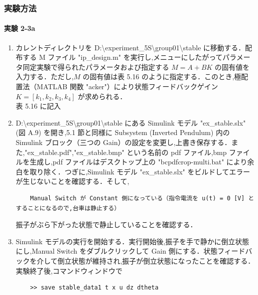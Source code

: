 \subsubsection{実験方法}

\paragraph{実験 2-3a}
\begin{enumerate}
  \item カレントディレクトリを D:\textbackslash experiment\_5S\textbackslash group01\textbackslash stable に移動する．配布する M ファイル "ip\_design.m" を実行し,メニューにしたがってパラメータ同定実験で得られたパラメータおよび指定する \( M = A + BK \) の固有値を入力する．ただし,\( M \) の固有値は表 5.16 のように指定する．このとき,極配置法（MATLAB 関数 "acker"）により状態フィードバックゲイン \( K = [k_1, k_2, k_3, k_4] \) が求められる．\\
        表 5.16 に記入
        
  \item D:\textbackslash experiment\_5S\textbackslash group01\textbackslash stable にある Simulink モデル "ex\_stable.slx" (図 A.9) を開き,5.1 節と同様に Subsystem (Inverted Pendulum) 内の Simulink ブロック（三つの Gain）の設定を変更し,上書き保存する．また,"ex\_stable.pdf","ex\_stable.bmp" という名前の pdf ファイル,bmp ファイルを生成し,pdf ファイルはデスクトップ上の "bcpdfcrop-multi.bat" により余白を取り除く．つぎに,Simulink モデル "ex\_stable.slx" をビルドしてエラーが生じないことを確認する．そして,
        
        \begin{tcolorbox}[colback=gray!5!white,colframe=gray!75!black]
          \begin{lstlisting}
    Manual Switch が Constant 側になっている（指令電流を u(t) = 0 [V] とすることになるので,台車は静止する）
    \end{lstlisting}
        \end{tcolorbox}
        
        振子がぶら下がった状態で静止していることを確認する．
        
  \item Simulink モデルの実行を開始する．実行開始後,振子を手で静かに倒立状態にし,Manual Switch をダブルクリックして Gain 側にする．状態フィードバックを介して倒立状態が維持され,振子が倒立状態になったことを確認する．実験終了後,コマンドウィンドウで
        
        \begin{tcolorbox}[colback=gray!5!white,colframe=gray!75!black]
          \begin{lstlisting}
    >> save stable_data1 t x u dz dtheta
    \end{lstlisting}
        \end{tcolorbox}
        

\end{enumerate}
